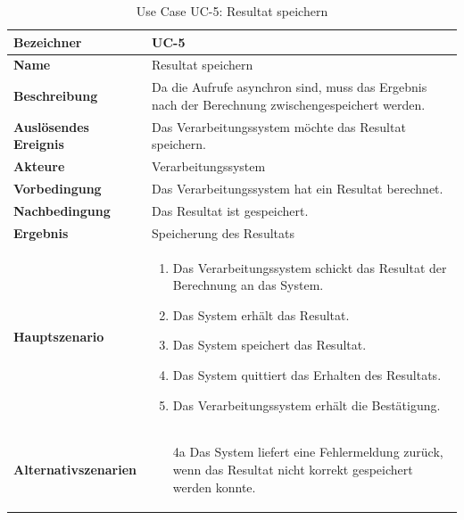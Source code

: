 \begin{table}[ht]
\centering
  \begin{tabular}{ l | p{10cm} }
	\hline
	\rowcolor{gray}
	\textbf{Bezeichner}	&	\textbf{UC-5}\\ \hline
	\textbf{Name}			&	Resultat speichern\\ \hline
	\textbf{Beschreibung}	&	Da die Aufrufe asynchron sind, muss das Ergebnis nach der Berechnung zwischengespeichert werden.\\ \hline
	\textbf{Auslösendes Ereignis}&	Das Verarbeitungssystem möchte das Resultat speichern.\\ \hline
	\textbf{Akteure}		&	Verarbeitungssystem\\ \hline
	\textbf{Vorbedingung}	&	Das Verarbeitungssystem hat ein Resultat berechnet.\\ \hline
	\textbf{Nachbedingung}	&	Das Resultat ist gespeichert.\\ \hline
	\textbf{Ergebnis}		&	Speicherung des Resultats\\ \hline
	\textbf{Hauptszenario}	&	\begin{enumerate}
					\item Das Verarbeitungssystem schickt das Resultat der Berechnung an das System.
					\item Das System erhält das Resultat.
					\item Das System speichert das Resultat.
					\item Das System quittiert das Erhalten des Resultats.
					\item Das Verarbeitungssystem erhält die Bestätigung.
					\end{enumerate}
					\\ \hline
	\textbf{Alternativszenarien}	&	\begin{enumerate}
					\item[4a] Das System liefert eine Fehlermeldung zurück, wenn das Resultat nicht korrekt gespeichert werden konnte.
					\end{enumerate}
					\\ \hline
  \end{tabular}
   \caption{Use Case UC-5: Resultat speichern}\label{table:use_case_5}
\end{table}

